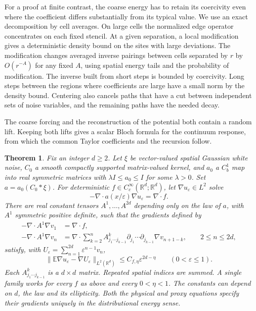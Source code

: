 \documentclass[11pt]{article}
\newtheorem{theorem}{Theorem}
\begin{document}
For a proof at finite contrast, the coarse energy has to retain its coercivity even where the coefficient differs substantially from its typical value. We use an exact decomposition by cell averages. On large cells the normalized edge operator concentrates on each fixed stencil. At a given separation, a local modification gives a deterministic density bound on the sites with large deviations. The modification changes averaged inverse pairings between cells separated by \(r\) by \(O(r^{-A})\) for any fixed \(A\), using spatial energy tails and the probability of modification. The inverse built from short steps is bounded by coercivity. Long steps between the regions where coefficients are large have a small norm by the density bound. Centering also cancels paths that have a cut between independent sets of noise variables, and the remaining paths have the needed decay.

The coarse forcing and the reconstruction of the potential both contain a random lift. Keeping both lifts gives a scalar Bloch formula for the continuum response, from which the common Taylor coefficients and the recursion follow.

\begin{theorem}\label{thm:main}
Fix an integer \(d\ge2\). Let \(\xi\) be vector-valued spatial Gaussian white noise, \(C_0\) a smooth compactly supported matrix-valued kernel, and \(a_0\) a \(C_b^1\) map into real symmetric matrices with \(\lambda I\le a_0\le I\) for some \(\lambda>0\). Set \(a=a_0(C_0*\xi)\). For deterministic \(f\in C_c^\infty(\mathbb R^d;\mathbb R^d)\), let \(\nabla u_\varepsilon\in L^2\) solve \[
 -\nabla\cdot a(x/\varepsilon)\nabla u_\varepsilon=\nabla\cdot f .
\] There are real constant tensors \(A^1,\ldots,A^{2d}\) depending only on the law of \(a\), with \(A^1\) symmetric positive definite, such that the gradients defined by \[
\begin{aligned}
-\nabla\cdot A^1\nabla v_1 &=\nabla\cdot f,\\
-\nabla\cdot A^1\nabla v_n &=
 \nabla\cdot\sum_{k=2}^n A^k_{j_1\cdots j_{k-1}}
 \partial_{j_1}\cdots\partial_{j_{k-1}}\nabla v_{n+1-k},
 \qquad 2\le n\le 2d,
\end{aligned}
\] satisfy, with \(U_\varepsilon=\sum_{n=1}^{2d}\varepsilon^{n-1}v_n\), \[
 \|\mathbb E\nabla u_\varepsilon-\nabla U_\varepsilon\|_{L^2(\mathbb R^d)}
 \le C_{f,\eta}\varepsilon^{2d-\eta}
 \qquad(0<\varepsilon\le1).
\] Each \(A^k_{j_1\cdots j_{k-1}}\) is a \(d\times d\) matrix. Repeated spatial indices are summed. A single family works for every \(f\) as above and every \(0<\eta<1\). The constants can depend on \(d\), the law and its ellipticity. Both the physical and proxy equations specify their gradients uniquely in the distributional energy sense.
\end{theorem}
\end{document}
